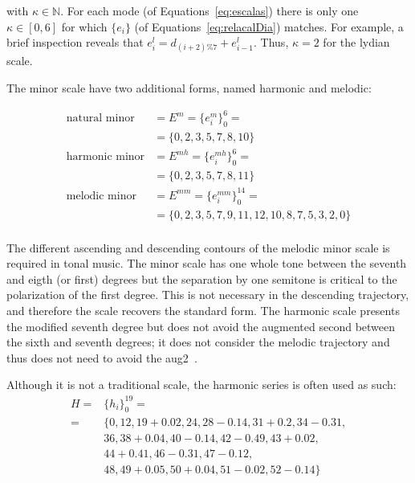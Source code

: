 \noindent with $\kappa \in \mathbb{N}$. For each mode (of Equations~\ref{eq:escalas}) there is only one $\kappa \in [0,6]$ for which $\{e_i\}$ (of Equations~\ref{eq:relacalDia}) matches. 
For example, a brief inspection reveals that
$e_i^{l}=d_{(i+2)\%7}+e_{i-1}^{l}$. Thus, $\kappa=2$ for the lydian scale.

The minor scale have two additional forms, named harmonic and melodic:

\begin{equation}\label{eq:escalasMenores}
\begin{split}
\text{natural minor}&  = E^m = \{e_i^m\}_0^6 = \\
                                           &  = \{0,2,3,5,7,8,10\} \\
\text{harmonic minor}                      &  = E^{mh} = \{e_i^{mh}\}_0^6 = \\
                                           &  = \{0,2,3,5,7,8,11\} \\
\text{melodic minor}                       &  = E^{mm} = \{e_i^{mm}\}_0^{14} = \\
                                           &  = \{0,2,3,5,7,9,11,12,10,8,7,5,3,2,0\} \\
\end{split}
\end{equation}

The different ascending and descending contours of the melodic minor scale is required in tonal music.
The minor scale has one whole tone between the seventh and eigth (or first) degrees but
the separation by one semitone is critical to the polarization of the first degree.
This is not necessary in the descending trajectory, and therefore the scale recovers the standard form.
The harmonic scale presents the modified seventh degree but does not avoid the augmented second between the sixth and seventh degrees; it does not consider the melodic trajectory and thus does not need to avoid the aug2~\cite{Harmonia}.

Although it is not a traditional scale, the harmonic series is often used as such:
\begin{equation}\label{eq:serieHarmonica}
\begin{split}
H = & \{h_i\}_0^{19}= \\
    =  & \{ 0,12,19+0.02,  24,28-0.14, 31+0.2, 34-0.31, \\
                     & 36, 38+0.04,40-0.14, 42-0.49, 43+0.02, \\
                     & 44+0.41, 46-0.31, 47-0.12, \\
                     & 48, 49+0.05, 50+0.04, 51-0.02, 52-0.14   \}
\end{split}
\end{equation}


